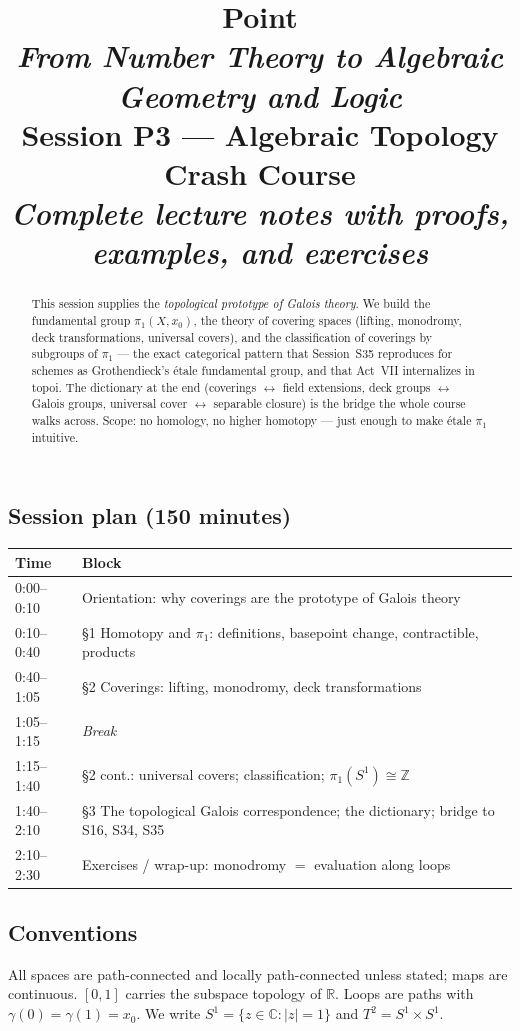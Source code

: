 \documentclass[11pt,a4paper]{article}
\title{
	{\color{blue!40!black}\textbf{\Huge Point}}\\[0.3em]
	\Large \textit{From Number Theory to Algebraic Geometry and Logic}\\[0.7em]
	\large \textbf{Session P3 --- Algebraic Topology Crash Course}\\[0.3em]
	\normalsize \emph{Complete lecture notes with proofs, examples, and exercises}
}
\author{}
\date{}
\theoremstyle{definition}
\newcommand{\Z}{\mathbb{Z}}
\newcommand{\R}{\mathbb{R}}
\newcommand{\C}{\mathbb{C}}
\begin{document}
	\maketitle
	\thispagestyle{empty}
	
	\begin{abstract}
		\noindent
		This session supplies the \emph{topological prototype of Galois theory}. We build the fundamental
		group $\pi_1(X,x_0)$, the theory of covering spaces (lifting, monodromy, deck transformations,
		universal covers), and the classification of coverings by subgroups of $\pi_1$ --- the exact
		categorical pattern that Session~S35 reproduces for schemes as Grothendieck's \'etale fundamental
		group, and that Act~VII internalizes in topoi. The dictionary at the end
		(coverings $\leftrightarrow$ field extensions, deck groups $\leftrightarrow$ Galois groups,
		universal cover $\leftrightarrow$ separable closure) is the bridge the whole course walks across.
		Scope: no homology, no higher homotopy --- just enough to make \'etale $\pi_1$ intuitive.
	\end{abstract}
	
	\subsection*{Session plan (150 minutes)}
	\begin{center}\small
		\begin{tabular}{|l|l|}
			\hline
			\textbf{Time} & \textbf{Block} \\
			\hline
			0:00--0:10 & Orientation: why coverings are the prototype of Galois theory \\
			0:10--0:40 & \S1 Homotopy and $\pi_1$: definitions, basepoint change, contractible, products \\
			0:40--1:05 & \S2 Coverings: lifting, monodromy, deck transformations \\
			1:05--1:15 & \emph{Break} \\
			1:15--1:40 & \S2 cont.: universal covers; classification; $\pi_1(S^1)\cong\Z$ \\
			1:40--2:10 & \S3 The topological Galois correspondence; the dictionary; bridge to S16, S34, S35 \\
			2:10--2:30 & Exercises / wrap-up: monodromy $=$ evaluation along loops \\
			\hline
		\end{tabular}
	\end{center}
	
	\subsection*{Conventions}
	All spaces are path-connected and locally path-connected unless stated; maps are continuous.
	$[0,1]$ carries the subspace topology of $\R$. Loops are paths with $\gamma(0)=\gamma(1)=x_0$.
	We write $S^1=\{z\in\C:|z|=1\}$ and $T^2=S^1\times S^1$.
	
\end{document}
